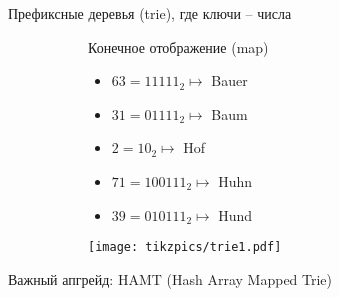 \begin{frame}{Префиксные деревья (trie), где ключи -- числа}
\begin{figure}[ht]
\begin{subfigure}{.39\textwidth}
Конечное отображение (map)
\begin{itemize}
\item $63=11111_2\mapsto$ Bauer 
\item $31=01111_2\mapsto$ Baum 
\item $2=10_2\mapsto$ Hof 
\item $71=100111_2\mapsto$ Huhn
\item $39=010111_2\mapsto$ Hund
\end{itemize}
\end{subfigure}
\begin{subfigure}{.59\textwidth}
\texttt{[image: tikzpics/trie1.pdf]}
\end{subfigure}
\end{figure}
\vspace{2em}
Важный апгрейд: HAMT (Hash Array Mapped Trie)
\end{frame}
